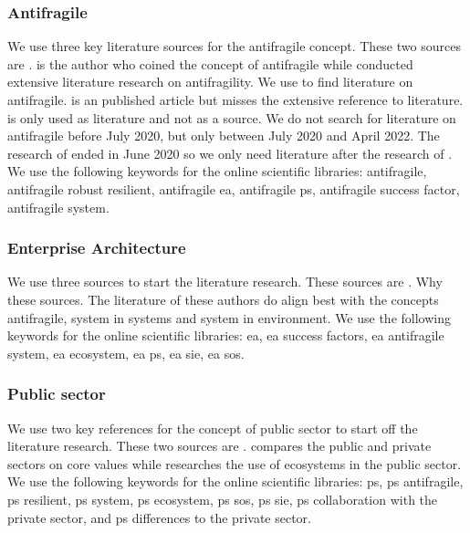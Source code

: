 \subsubsection{Antifragile}
\label{subsub:antifragile}
We use three key literature sources for the \gls{antifragile} concept. These two sources are \textcites{Taleb2012}{Botjes2020}{Botjes2021}. \textcite{Taleb2012} is the author who coined the concept of \gls{antifragile} while \textcite{Botjes2020} conducted extensive literature research on \gls{antifragility}. We use \textcite{Botjes2020} to find literature on antifragile. \textcite{Botjes2021} is an published article but misses the extensive reference to literature. \textcite{Botjes2021} is only used as literature and not as a source. We do not search for literature on antifragile before July 2020, but only between July 2020 and April 2022. The research of \textcite{Botjes2020} ended in June 2020 so we only need literature after the research of \textcite{Botjes2020}. We use the following keywords for the online scientific libraries: \gls{antifragile}, \gls{antifragile} \gls{robust} \gls{resilient}, \gls{antifragile} \acrlong{ea}, \gls{antifragile} \gls{ps}, \gls{antifragile} success factor, \gls{antifragile} system.

\subsubsection{Enterprise Architecture}
\label{subsub:enterprisearchitecture}
We use three sources to start the literature research. These sources are \textcites{Graves2008}{Hoogervorst2009}{Lapalme2012b}. Why these sources. The literature of these authors do align best with the concepts antifragile, system in systems and system in environment. We use the following keywords for the online scientific libraries: \acrlong{ea}, \acrlong{ea} success factors, \acrlong{ea} \gls{antifragile} system, \acrlong{ea} ecosystem, \acrlong{ea} \gls{ps}, \acrlong{ea} \acrlong{sie}, \acrlong{ea} \acrlong{sos}.

\subsubsection{Public sector}
\label{subsub:publicsector}
We use two key references for the concept of public sector to start off the literature research. These two sources are \textcites{Wal2008}{Nurmi2021}. \textcite{Wal2008} compares the public and private sectors on core values while \textcite{Nurmi2021} researches the use of ecosystems in the public sector. We use the following keywords for the online scientific libraries: \gls{ps}, \gls{ps} \gls{antifragile}, \gls{ps} \gls{resilient}, \gls{ps} system, \gls{ps} ecosystem, \gls{ps} \acrlong{sos}, \gls{ps} \acrlong{sie}, \gls{ps} collaboration with the private sector, and \gls{ps} differences to the private sector.


